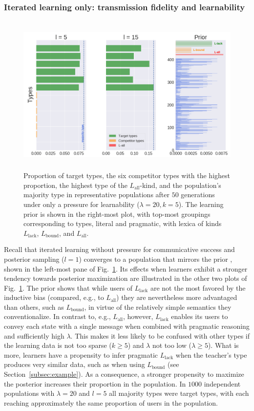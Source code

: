 \documentclass[a4paper, 11pt]{article}
\theoremstyle{Satz}
\newcommand{\mylang}[1]{\ensuremath{L_{\text{#1}}}\xspace} %
\newcommand{\Lall}{\mylang{all}}
\newcommand{\Lbound}{\mylang{bound}}
\newcommand{\Llack}{\mylang{lack}}
\begin{document}
\subsubsection{Iterated learning only: transmission fidelity and learnability}

\begin{figure}[t]
\centering
\includegraphics[width=1\textwidth,height=8cm,keepaspectratio]{./plots/fig4}

\caption{Proportion of target types, the six competitor types with the highest proportion, the highest type of the $\Lall$-kind, and the population's majority type in representative populations after $50$ generations under only a
  pressure for learnability ($\lambda = 20, k = 5$). The learning prior is shown in the
  right-most plot, with top-most groupings corresponding to types, literal and pragmatic, with
  lexica of kinds $\Llack$, $\Lbound$, and $\Lall$.}
\label{fig:only-M}
\end{figure}

Recall that iterated learning without pressure for communicative success and posterior sampling ($l = 1$) converges to a population that mirrors the prior \citep{griffiths+kalish:2007}, shown in the left-most pane of Fig.~\ref{fig:only-M}. Its effects when learners exhibit a stronger tendency towards posterior maximization are illustrated in the other two plots of Fig.~\ref{fig:only-M}. The prior shows that while users of $\Llack$ are not the most favored by the inductive bias (compared, e.g., to
$\Lall$) they are nevertheless more advantaged than others, such as $\Lbound$, in virtue of the
relatively simple semantics they conventionalize. In contrast to, e.g., $\Lall$, however, $\Llack$ enables its users to
convey each state with a single message when combined with pragmatic reasoning and sufficiently
high $\lambda$. This makes it less likely to be confused with other types if the learning data
is not too sparse ($k \geq 5$) and $\lambda$ not too low ($\lambda \geq 5$). What is more, learners have a propensity to infer pragmatic $\Llack$ when the teacher's type produces very similar data, such as when using $\Lbound$ (see Section~\ref{subsec:example}). As a consequence, a stronger propensity to maximize the posterior increases their
proportion in the population. In $1000$
independent populations with $\lambda = 20$ and $l = 5$ all majority types were target types,
with each reaching approximately the same proportion of users in the population.
\end{document}
